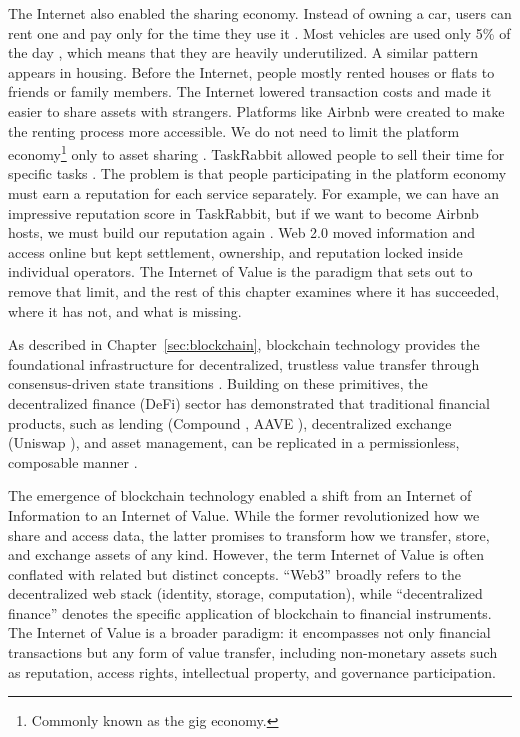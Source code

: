 The Internet also enabled the sharing economy. Instead of owning a car, users can rent one and pay only for the time they use it \cite{Parker2016}.
Most vehicles are used only 5\% of the day \cite{Keith2022}, which means that they are heavily underutilized. A similar pattern appears in housing.
Before the Internet, people mostly rented houses or flats to friends or family members. The Internet lowered transaction costs and made it easier to share assets with strangers.
Platforms like Airbnb were created to make the renting process more accessible. We do not need to limit the platform economy\footnote{Commonly known as the gig economy.} only to asset sharing \cite{Cupi2022, Sundararajan2016}.
TaskRabbit allowed people to sell their time for specific tasks \cite{Prassl2015}.
The problem is that people participating in the platform economy must earn a reputation for each service separately.
For example, we can have an impressive reputation score in TaskRabbit, but if we want to become Airbnb hosts, we must build our reputation again \cite{Schor2016}.
Web 2.0 moved information and access online but kept settlement, ownership, and reputation locked inside individual operators. The Internet of Value is the paradigm that sets out to remove that limit, and the rest of this chapter examines where it has succeeded, where it has not, and what is missing.

As described in Chapter~\ref{sec:blockchain}, blockchain technology provides the foundational infrastructure for decentralized, trustless value transfer through consensus-driven state transitions \cite{Nakamoto, wood2014ethereum}. Building on these primitives, the decentralized finance (DeFi) sector has demonstrated that traditional financial products, such as lending (Compound \cite{papangelou2023exploring}, AAVE \cite{gambacorta2024defi, frangella2022aave}), decentralized exchange (Uniswap \cite{Adams2021}), and asset management, can be replicated in a permissionless, composable manner \cite{Angeris2020, Kim2022}.

The emergence of blockchain technology enabled a shift from an Internet of Information to an Internet of Value. While the former revolutionized how we share and access data, the latter promises
to transform how we transfer, store, and exchange assets of any kind.
However, the term Internet of Value is often conflated with related but distinct concepts. ``Web3'' broadly refers to the decentralized web stack (identity, storage, computation), while ``decentralized finance'' denotes the specific application of blockchain to financial instruments. The Internet of Value is a broader paradigm: it encompasses not only financial transactions but any form of value transfer, including non-monetary assets such as reputation, access rights, intellectual property, and governance participation.

